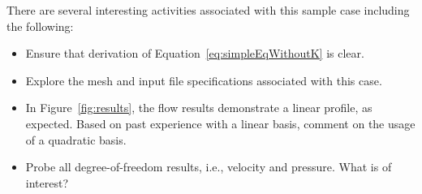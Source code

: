 \documentclass{article}
\begin{document}
There are several interesting activities associated with this sample case including
the following:

\begin{itemize}
	\item Ensure that derivation of Equation~\ref{eq:simpleEqWithoutK} is clear.
	\item Explore the mesh and input file specifications associated with this case.
	\item In Figure~\ref{fig:results}, the flow results demonstrate a linear profile, as 
          expected. Based on past experience with a linear basis, comment on the usage of a quadratic
          basis.
        \item Probe all degree-of-freedom results, i.e., velocity and pressure. What is of interest?
\end{itemize}
\end{document}
